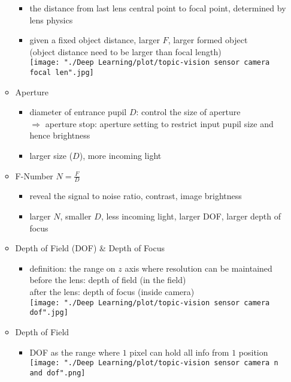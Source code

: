 \begin{itemize}
\begin{itemize}
		\begin{itemize}
		\item the distance from last lens central point to focal point, determined by lens physics
		\item given a fixed object distance, larger $F$, larger formed object \\
		(object distance need to be larger than focal length) \\
		\texttt{[image: "./Deep Learning/plot/topic-vision sensor camera focal len".jpg]}
		\end{itemize}
	\item Aperture
		\begin{itemize}
		\item diameter of entrance pupil $D$: control the size of aperture \\
		$\Rightarrow$ aperture stop: aperture setting to restrict input pupil size and hence brightness
		\item larger size ($D$), more incoming light
		\end{itemize}
	\item F-Number $N = \frac F D$
		\begin{itemize}
		\item reveal the signal to noise ratio, contrast, image brightness
		\item larger $N$, smaller $D$, less incoming light, larger DOF, larger depth of focus
		\end{itemize}
	\item Depth of Field (DOF) \& Depth of Focus
		\begin{itemize}
		\item definition: the range on $z$ axis where resolution can be maintained \\
		before the lens: depth of field (in the field) \\
		after the lens: depth of focus (inside camera) \\
		\texttt{[image: "./Deep Learning/plot/topic-vision sensor  camera dof".jpg]}		
		\end{itemize}
	\item Depth of Field
		\begin{itemize}
		\item DOF as the range where $1$ pixel can hold all info from $1$ position \\
		\texttt{[image: "./Deep Learning/plot/topic-vision sensor  camera n and dof".png]} \\

\end{itemize}
\end{itemize}
\end{itemize}
